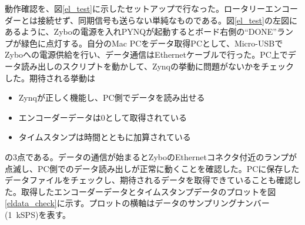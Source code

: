 動作確認を、図\ref{el_test}に示したセットアップで行なった。ロータリーエンコーダーとは接続せず、同期信号も送らない単純なものである。図\ref{el_test}の左図にあるように、Zyboの電源を入れPYNQが起動するとボード右側の``DONE''ランプが緑色に点灯する。自分のMac PCをデータ取得PCとして、Micro-USBでZyboへの電源供給を行い、データ通信はEthernetケーブルで行った。PC上でデータ読み出しのスクリプトを動かして、Zynqの挙動に問題がないかをチェックした。期待される挙動は
\begin{itemize}
  \item Zynqが正しく機能し、PC側でデータを読み出せる
  \item エンコーダーデータは0として取得されている
  \item タイムスタンプは時間とともに加算されている
\end{itemize}
の3点である。データの通信が始まるとZyboのEthernetコネクタ付近のランプが点滅し、PC側でのデータ読み出しが正常に動くことを確認した。PCに保存したデータファイルをチェックし、期待されるデータを取得できていることも確認した。取得したエンコーダーデータとタイムスタンプデータのプロットを図\ref{eldata_check}に示す。プロットの横軸はデータのサンプリングナンバー(\SI{1}{kSPS})を表す。


